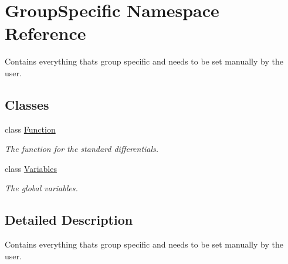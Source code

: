 \hypertarget{namespaceGroupSpecific}{}\section{Group\+Specific Namespace Reference}
\label{namespaceGroupSpecific}


Contains everything that\textquotesingle{}s group specific and needs to be set manually by the user.  


\subsection*{Classes}
\begin{DoxyCompactItemize}
\item 
class \hyperlink{classGroupSpecific_1_1Function}{Function}
\begin{DoxyCompactList}\small\item\em The function for the standard differentials. \end{DoxyCompactList}\item 
class \hyperlink{classGroupSpecific_1_1Variables}{Variables}
\begin{DoxyCompactList}\small\item\em The global variables. \end{DoxyCompactList}\end{DoxyCompactItemize}


\subsection{Detailed Description}
Contains everything that\textquotesingle{}s group specific and needs to be set manually by the user. 